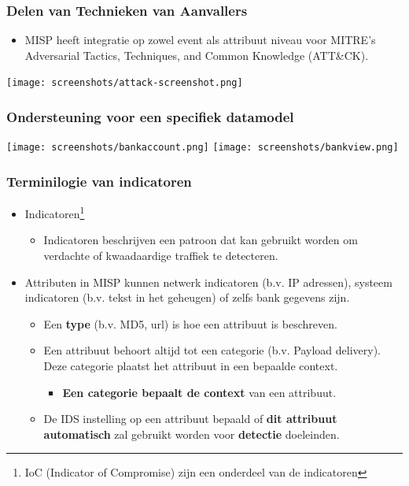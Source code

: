 \begin{frame}
        \frametitle{Delen van Technieken van Aanvallers}
        \begin{itemize}
                \item MISP heeft integratie op zowel event als attribuut niveau voor MITRE's Adversarial Tactics, Techniques, and Common Knowledge (ATT\&CK).
        \end{itemize}
        \texttt{[image: screenshots/attack-screenshot.png]}
\end{frame}

\begin{frame}
        \frametitle{Ondersteuning voor een specifiek datamodel}
        \texttt{[image: screenshots/bankaccount.png]}
        \texttt{[image: screenshots/bankview.png]}
\end{frame}

\begin{frame}
        \frametitle{Terminilogie van indicatoren}
        \begin{itemize}
                \item Indicatoren\footnote{IoC (Indicator of Compromise) zijn een onderdeel van de indicatoren}
                        \begin{itemize}
                                \item Indicatoren beschrijven een patroon dat kan gebruikt worden om verdachte of kwaadaardige traffiek te detecteren.
                        \end{itemize}
                \item Attributen in MISP kunnen netwerk indicatoren (b.v. IP adressen), systeem indicatoren (b.v. tekst in het geheugen) of zelfs bank gegevens zijn.
                \begin{itemize}
                        \item Een {\bf type} (b.v. MD5, url) is hoe een attribuut is beschreven.
                \end{itemize}
                \begin{itemize}
                \item Een attribuut behoort altijd tot een categorie (b.v. Payload delivery). Deze categorie plaatst het attribuut in een bepaalde context.
                        \begin{itemize}
                                \item {\bf Een categorie bepaalt de context } van een attribuut.
                        \end{itemize}
                \item De IDS instelling op een attribuut bepaald of {\bf dit attribuut automatisch} zal gebruikt worden voor {\bf detectie} doeleinden.
                \end{itemize}
        \end{itemize}
\end{frame}

